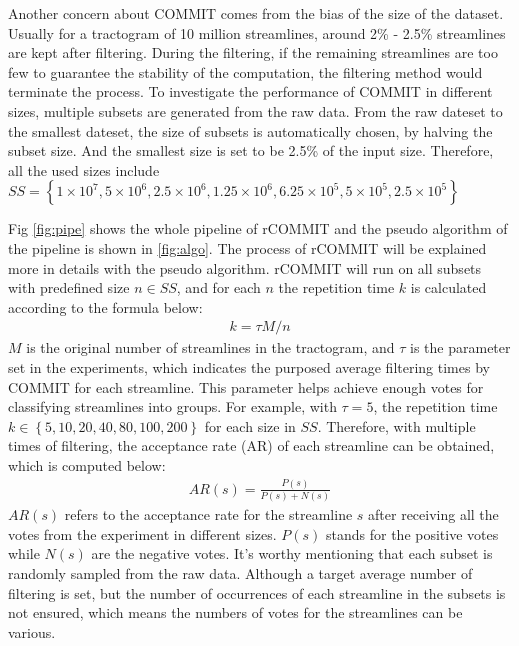 Another concern about COMMIT comes from the bias of the size of the dataset. Usually for a tractogram of 10 million streamlines, around 2\% - 2.5\% streamlines are kept after filtering.
During the filtering, if the remaining streamlines are too few to guarantee the stability of the computation, the filtering method would terminate the process.
To investigate the performance of COMMIT in different sizes, 
multiple subsets are generated from the raw data. From the raw dateset to the smallest dateset, the size of subsets is automatically chosen, by halving
the subset size. And the smallest size is set to be 2.5\% of the input size. Therefore, all the used sizes include $SS= \left \{  1\times 10^7, 5\times 10^6, 2.5\times 10^6, 1.25\times 10^6, 6.25\times 10^5, 5\times 10^5, 2.5\times 10^5 \right \}$ 

Fig \ref{fig:pipe} shows the whole pipeline of rCOMMIT and the pseudo algorithm of the pipeline is shown in \ref{fig:algo}. 
The process of rCOMMIT will be explained more in details with the pseudo algorithm. rCOMMIT will run on all subsets with predefined
size $n \in SS$, and for each $n$ the repetition time $k$ is calculated according to the formula below:
\begin{gather}\label{computek}  
    k = \tau M/n
\end{gather}
$M$ is the original number of streamlines in the tractogram, and $\tau$ is the parameter set in the experiments, 
which indicates the purposed average filtering times by COMMIT for each streamline. This parameter helps achieve enough votes for classifying streamlines into groups.
For example, with $\tau=5$, the repetition time $k \in \left \{5, 10, 20, 40, 80, 100, 200 \right \}$ for each size in $SS$.
Therefore, with multiple times of filtering, the acceptance rate (AR) of each streamline can be obtained, which is computed below:
\begin{gather}\label{AR}
    AR(s) = \frac{P(s)}{P(s)+ N(s)}
\end{gather}
$AR(s)$ refers to the acceptance rate for the streamline $s$ after receiving all the votes from the experiment in different sizes.
$P(s)$ stands for the positive votes while $N(s)$ are the negative votes.
It's worthy mentioning that each subset is randomly sampled from the raw data. 
Although a target average number of filtering is set, but the number of occurrences of each streamline in the subsets is not ensured, 
which means the numbers of votes for the streamlines can be various.

